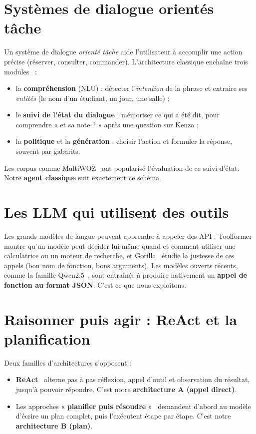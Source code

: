 \documentclass[11pt,a4paper]{report}
\begin{document}
\section{Systèmes de dialogue orientés tâche}
Un système de dialogue \emph{orienté tâche} aide l'utilisateur à accomplir une action précise (réserver,
consulter, commander). L'architecture classique enchaîne trois modules~\cite{jurafsky} :
\begin{itemize}
  \item la \textbf{compréhension} (NLU) : détecter l'\emph{intention} de la phrase et extraire ses
        \emph{entités} (le nom d'un étudiant, un jour, une salle) ;
  \item le \textbf{suivi de l'état du dialogue} : mémoriser ce qui a été dit, pour comprendre « et sa note ? »
        après une question sur Kenza ;
  \item la \textbf{politique} et la \textbf{génération} : choisir l'action et formuler la réponse, souvent par
        gabarits.
\end{itemize}
Les corpus comme MultiWOZ~\cite{multiwoz} ont popularisé l'évaluation de ce suivi d'état. Notre \textbf{agent
classique} suit exactement ce schéma.

\section{Les LLM qui utilisent des outils}
Les grands modèles de langue peuvent apprendre à appeler des API : Toolformer~\cite{toolformer} montre qu'un
modèle peut décider lui-même quand et comment utiliser une calculatrice ou un moteur de recherche, et
Gorilla~\cite{gorilla} étudie la justesse de ces appels (bon nom de fonction, bons arguments). Les modèles ouverts
récents, comme la famille Qwen2.5~\cite{qwen}, sont entraînés à produire nativement un \textbf{appel de fonction au
format JSON}. C'est ce que nous exploitons.

\section{Raisonner puis agir : ReAct et la planification}
Deux familles d'architectures s'opposent :
\begin{itemize}
  \item \textbf{ReAct}~\cite{react} alterne pas à pas réflexion, appel d'outil et observation du résultat, jusqu'à
        pouvoir répondre. C'est notre \textbf{architecture A (appel direct)}.
  \item Les approches « \textbf{planifier puis résoudre} »~\cite{planandsolve} demandent d'abord au modèle
        d'écrire un plan complet, puis l'exécutent étape par étape. C'est notre \textbf{architecture B (plan)}.
\end{itemize}
\end{document}
